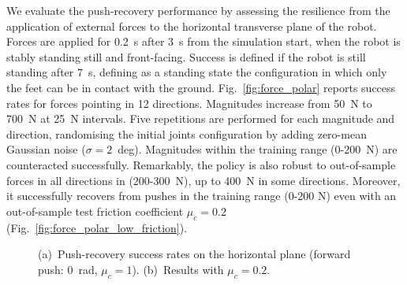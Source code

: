 We evaluate the push-recovery performance by assessing the resilience from the application of external forces to the horizontal transverse plane of the robot.
Forces are applied for 0.2~s after 3~s from the simulation start, when the robot is stably standing still and front-facing.
Success is defined if the robot is still standing after 7~s, defining as a standing state the configuration in which only the feet can be in contact with the ground.
Fig.~\ref{fig:force_polar} reports success rates for forces pointing in 12 directions.
Magnitudes increase from 50~N to 700~N at 25~N intervals.
Five repetitions are performed for each magnitude and direction, randomising the initial joints configuration by adding zero-mean Gaussian noise ($\sigma = 2$~deg).
Magnitudes within the training range (0-200~N) are counteracted successfully.
Remarkably, the policy is also robust to out-of-sample forces in all directions in (200-300~N), up to 400~N in some directions.
Moreover, it successfully recovers from pushes in the training range (0-200 N) even with an out-of-sample test friction coefficient $\mu_c=0.2$ (Fig.~\ref{fig:force_polar_low_friction}).

\begin{figure}
    \centering
    \hspace{-7mm}
    \caption{(a)~Push-recovery success rates on the horizontal plane (forward push: $0$~rad, $\mu_c=1$). (b)~Results with  $\mu_c=0.2$.}
\end{figure}

